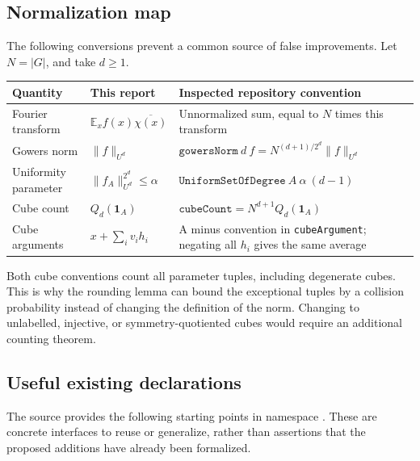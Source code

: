 \documentclass[11pt,letterpaper]{article}
\numberwithin{equation}{section}
\theoremstyle{definition}
\theoremstyle{remark}
\newcommand{\E}{\mathbb E}
\newcommand{\1}{\mathbf 1}
\begin{document}
\subsection{Normalization map}

The following conversions prevent a common source of false improvements.
Let $N=|G|$, and take $d\ge1$.

\begin{center}
\small
\begin{tabularx}{\textwidth}{@{}p{}X X@{}}
\toprule
Quantity & This report & Inspected repository convention\\
\midrule
Fourier transform & $\E_x f(x)\overline{\chi(x)}$ & Unnormalized sum,
equal to $N$ times this transform\\
Gowers norm & $\|f\|_{U^d}$ &
$\texttt{gowersNorm}\ d\ f=N^{(d+1)/2^d}\|f\|_{U^d}$\\
Uniformity parameter & $\|f_A\|_{U^d}^{2^d}\le\alpha$ &
$\texttt{UniformSetOfDegree}\ A\ \alpha\ (d-1)$\\
Cube count & $Q_d(\1_A)$ &
$\texttt{cubeCount}=N^{d+1}Q_d(\1_A)$\\
Cube arguments & $x+\sum_i v_i h_i$ & A minus convention in
\texttt{cubeArgument}; negating all $h_i$ gives the same average\\
\bottomrule
\end{tabularx}
\end{center}

Both cube conventions count all parameter tuples, including degenerate
cubes. This is why the rounding lemma can bound the exceptional tuples
by a collision probability instead of changing the definition of the
norm. Changing to unlabelled, injective, or symmetry-quotiented cubes
would require an additional counting theorem.

\subsection{Useful existing declarations}

The source provides the following starting points in namespace
. These are concrete interfaces to
reuse or generalize, rather than assertions that the proposed additions
have already been formalized.
\end{document}
